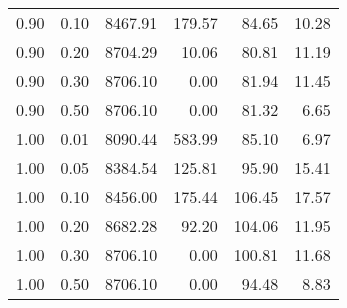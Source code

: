 \begin{table}
\begin{tabular}{rrrrrr}
0.90 & 0.10 & 8467.91 & 179.57 & 84.65 & 10.28 \\
0.90 & 0.20 & 8704.29 & 10.06 & 80.81 & 11.19 \\
0.90 & 0.30 & 8706.10 & 0.00 & 81.94 & 11.45 \\
0.90 & 0.50 & 8706.10 & 0.00 & 81.32 & 6.65 \\
1.00 & 0.01 & 8090.44 & 583.99 & 85.10 & 6.97 \\
1.00 & 0.05 & 8384.54 & 125.81 & 95.90 & 15.41 \\
1.00 & 0.10 & 8456.00 & 175.44 & 106.45 & 17.57 \\
1.00 & 0.20 & 8682.28 & 92.20 & 104.06 & 11.95 \\
1.00 & 0.30 & 8706.10 & 0.00 & 100.81 & 11.68 \\
1.00 & 0.50 & 8706.10 & 0.00 & 94.48 & 8.83 \\
\bottomrule
\end{tabular}
\end{table}
